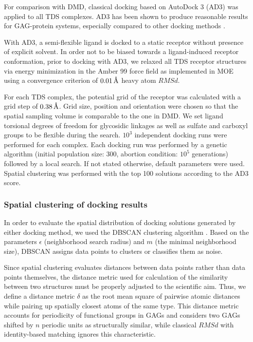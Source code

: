 For comparison with DMD, classical docking based on AutoDock
3\cite{morris_automated_1999} (AD3) was applied to all TDS complexes. AD3 has
been shown to produce reasonable results for GAG-protein systems, especially
compared to other docking methods  \cite{japan_docking_ad3_clustering,
samsonov_docking_2011, imberty_perez_protgag_comp_book_2006,
franz_cathepsin_2013}.

With AD3, a semi-flexible ligand is docked to a static receptor without presence
of explicit solvent. In order not to be biased towards a ligand-induced receptor
conformation, prior to docking with AD3, we relaxed all TDS receptor structures
via energy minimization in the Amber 99 force field as implemented in MOE
\cite{chemical_computing_group_inc_moe_2010} using a convergence criterion of
$0.01\,\textup{\AA}$ heavy atom $RMSd$.

For each TDS complex, the potential grid of the receptor was calculated with a
grid step of $0.38\,\textup{\AA}$. Grid size, position and orientation were chosen
so that the spatial sampling volume is comparable to the one in DMD. We set
ligand torsional degrees of freedom for glycosidic linkages as well as sulfate
and carboxyl groups to be flexible during the search. $10^3$ independent docking
runs were performed for each complex. Each docking run was performed by a
genetic algorithm (initial population size: 300, abortion condition: $10^5$
generations) followed by a local search. If not stated otherwise, default
parameters were used. Spatial clustering was performed with the top 100
solutions according to the AD3 score.

\subsubsection{Spatial clustering of docking results}
In order to evaluate the spatial distribution of docking solutions generated by
either docking method, we used the DBSCAN clustering algorithm
\cite{dbscan_ester1996}. Based on the  parameters $\epsilon$ (neighborhood
search radius) and $m$ (the minimal neighborhood size), DBSCAN assigns data
points to clusters or classifies them as noise.

Since spatial clustering evaluates distances between data points rather than
data points themselves, the distance metric used for calculation of the
similarity between two structures must be properly adjusted to the scientific
aim. Thus, we define a distance metric $\delta$ as the root mean square of
pairwise atomic distances while pairing up spatially closest atoms of the same
type. This distance metric accounts for periodicity of functional groups in GAGs
and considers two GAGs shifted by $n$ periodic units as structurally similar,
while classical $RMSd$ with identity-based matching ignores this characteristic.

